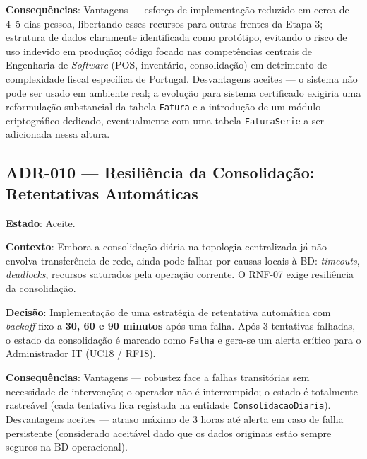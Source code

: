 \noindent\textbf{Consequências}: Vantagens --- esforço de implementação reduzido em cerca de 4--5 dias-pessoa, libertando esses recursos para outras frentes da Etapa 3; estrutura de dados claramente identificada como protótipo, evitando o risco de uso indevido em produção; código focado nas competências centrais de Engenharia de \textit{Software} (POS, inventário, consolidação) em detrimento de complexidade fiscal específica de Portugal. Desvantagens aceites --- o sistema não pode ser usado em ambiente real; a evolução para sistema certificado exigiria uma reformulação substancial da tabela \texttt{Fatura} e a introdução de um módulo criptográfico dedicado, eventualmente com uma tabela \texttt{FaturaSerie} a ser adicionada nessa altura.

\subsection*{ADR-010 --- Resiliência da Consolidação: Retentativas Automáticas}

\noindent\textbf{Estado}: Aceite.

\noindent\textbf{Contexto}: Embora a consolidação diária na topologia centralizada já não envolva transferência de rede, ainda pode falhar por causas locais à BD: \textit{timeouts}, \textit{deadlocks}, recursos saturados pela operação corrente. O RNF-07 exige resiliência da consolidação.

\noindent\textbf{Decisão}: Implementação de uma estratégia de retentativa automática com \textit{backoff} fixo a \textbf{30, 60 e 90 minutos} após uma falha. Após 3 tentativas falhadas, o estado da consolidação é marcado como \texttt{Falha} e gera-se um alerta crítico para o Administrador IT (UC18 / RF18).

\noindent\textbf{Consequências}: Vantagens --- robustez face a falhas transitórias sem necessidade de intervenção; o operador não é interrompido; o estado é totalmente rastreável (cada tentativa fica registada na entidade \texttt{ConsolidacaoDiaria}). Desvantagens aceites --- atraso máximo de 3 horas até alerta em caso de falha persistente (considerado aceitável dado que os dados originais estão sempre seguros na BD operacional).

